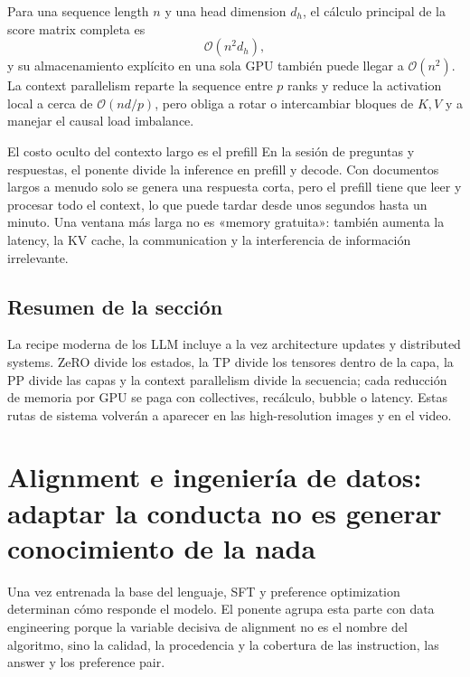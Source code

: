 \documentclass[a4paper]{article}
\begin{document}
Para una sequence length $n$ y una head dimension $d_h$, el cálculo principal de la score matrix completa es
\[
\mathcal{O}(n^2d_h),
\]
y su almacenamiento explícito en una sola GPU también puede llegar a $\mathcal{O}(n^2)$. La context parallelism reparte la sequence entre $p$ ranks y reduce la activation local a cerca de $\mathcal{O}(nd/p)$, pero obliga a rotar o intercambiar bloques de $K,V$ y a manejar el causal load imbalance.

\begin{warningbox}{El costo oculto del contexto largo es el prefill}
En la sesión de preguntas y respuestas, el ponente divide la inference en prefill y decode. Con documentos largos a menudo solo se genera una respuesta corta, pero el prefill tiene que leer y procesar todo el context, lo que puede tardar desde unos segundos hasta un minuto. Una ventana más larga no es «memory gratuita»: también aumenta la latency, la KV cache, la communication y la interferencia de información irrelevante.
\end{warningbox}


\subsection{Resumen de la sección}

La recipe moderna de los LLM incluye a la vez architecture updates y distributed systems. ZeRO divide los estados, la TP divide los tensores dentro de la capa, la PP divide las capas y la context parallelism divide la secuencia; cada reducción de memoria por GPU se paga con collectives, recálculo, bubble o latency. Estas rutas de sistema volverán a aparecer en las high-resolution images y en el video.
\section{Alignment e ingeniería de datos: adaptar la conducta no es generar conocimiento de la nada}

Una vez entrenada la base del lenguaje, SFT y preference optimization determinan cómo responde el modelo. El ponente agrupa esta parte con data engineering porque la variable decisiva de alignment no es el nombre del algoritmo, sino la calidad, la procedencia y la cobertura de las instruction, las answer y los preference pair.
\end{document}
